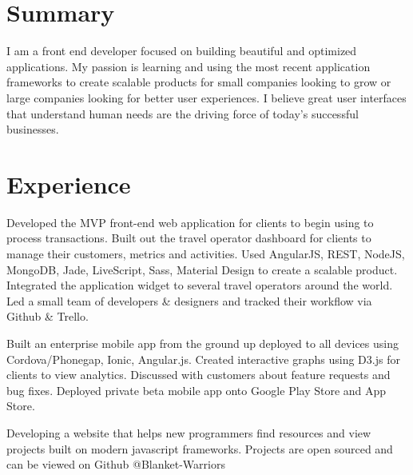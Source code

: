 \documentclass[]{deedy-resume-openfont}
\begin{document}
\begin{minipage}[t]{0.64\textwidth} 


\section{Summary}
I am a front end developer focused on building beautiful and optimized applications. My passion is learning and using the most recent application frameworks to create scalable products for small companies looking to grow or large companies looking for better user experiences. I believe great user interfaces that understand human needs are the driving force of today's successful businesses.
\sectionsep


\section{Experience}

\descriptsep
Developed the MVP front-end web application for clients to begin using to process transactions.
Built out the travel operator dashboard for clients to manage their customers, metrics and activities.
Used AngularJS, REST, NodeJS, MongoDB, Jade, LiveScript, Sass, Material Design to create a scalable product. Integrated the application widget to several travel operators around the world. Led a small team of developers \& designers and tracked their workflow via Github \& Trello.
\sectionsep
\sectionsepextra

\descriptsep
Built an enterprise mobile app from the ground up deployed to all devices using Cordova/Phonegap, Ionic, Angular.js. Created interactive graphs using D3.js for clients to view analytics. Discussed with customers about feature requests and bug fixes. Deployed private beta mobile app onto Google Play Store and App Store.
\sectionsep
\sectionsepextra

\descriptsep
Developing a website that helps new programmers find resources and view projects built on modern javascript frameworks. Projects are open sourced and can be viewed on Github @Blanket-Warriors\sectionsep
\sectionsepextra


\end{minipage}
\end{document}
